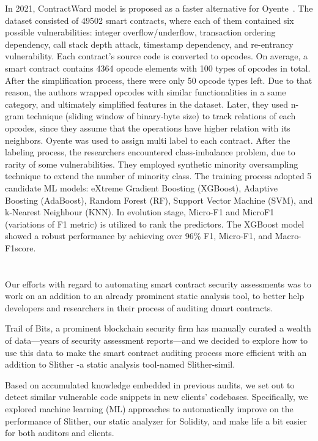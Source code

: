 In 2021, ContractWard model is proposed as a faster alternative for Oyente~\cite{oyente}.
The dataset consisted of 49502 smart contracts, where each of them contained six possible vulnerabilities: integer overflow/underflow, transaction ordering dependency,
call stack depth attack, timestamp dependency, and re-entrancy vulnerability.
Each contract's source code is converted to opcodes.
On average, a smart contract contains 4364 opcode elements with 100 types of opcodes in total.
After the simplification process, there were only 50 opcode types left.
Due to that reason, the authors wrapped opcodes with similar functionalities in a same category, and ultimately simplified features in the dataset.
Later, they used n-gram technique (sliding window of binary-byte size) to track relations of each opcodes, since they assume that the operations have higher relation with its neighbors.
Oyente was used to assign multi label to each contract.
After the labeling process, the researchers encountered class-imbalance problem, due to rarity of some vulnerabilities.
They employed synthetic minority oversampling technique to extend the number of minority class.
The training process adopted 5 candidate ML models: eXtreme Gradient Boosting (XGBoost), Adaptive Boosting (AdaBoost), Random Forest (RF), Support Vector Machine (SVM), and k-Nearest Neighbour (KNN).
In evolution stage, Micro-F1 and MicroF1 (variations of F1 metric) is utilized to rank the predictors.
The XGBoost model showed a robust performance by achieving over 96\% F1, Micro-F1, and Macro-F1score.

\section{\slithersimil}
Our efforts with regard to automating smart contract security assessments was to work on an addition to an already prominent static analysis tool, to better help developers and researchers in their process of auditing dmart contracts.

Trail of Bits, a prominent blockchain security firm has manually curated a wealth of data—years of security assessment reports—and we decided to explore how to use this data to make the smart contract auditing process more efficient with an addition to Slither -a static analysis tool-named Slither-simil.

Based on accumulated knowledge embedded in previous audits, we set out to detect similar vulnerable code snippets in new clients' codebases. Specifically, we explored machine learning (ML) approaches to automatically improve on the performance of Slither, our static analyzer for Solidity, and make life a bit easier for both auditors and clients.

